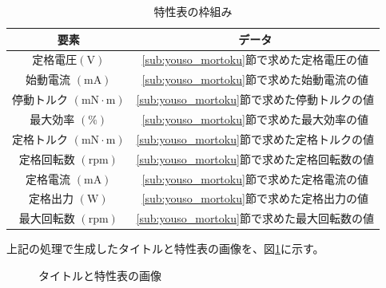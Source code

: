 \begin{table}[t]
	\centering
	\caption{特性表の枠組み}
	\begin{tabular}{|c|c|} \hline
	  要素 & データ \\ \hline \hline
	  定格電圧$(\mathrm{V})$ & \ref{sub:youso_mortoku}節で求めた定格電圧の値 \\ \hline
	  始動電流 $(\mathrm{mA})$&  \ref{sub:youso_mortoku}節で求めた始動電流の値 \\ \hline
	  停動トルク $(\mathrm{mN \cdot m})$& \ref{sub:youso_mortoku}節で求めた停動トルクの値  \\ \hline
      最大効率 $(\mathrm{\%})$& \ref{sub:youso_mortoku}節で求めた最大効率の値  \\ \hline
      定格トルク $(\mathrm{mN \cdot m})$& \ref{sub:youso_mortoku}節で求めた定格トルクの値 \\ \hline
	  定格回転数 $(\mathrm{rpm})$& \ref{sub:youso_mortoku}節で求めた定格回転数の値  \\ \hline
      定格電流 $(\mathrm{mA})$& \ref{sub:youso_mortoku}節で求めた定格電流の値  \\ \hline
      定格出力 $(\mathrm{W})$& \ref{sub:youso_mortoku}節で求めた定格出力の値 \\ \hline
	  最大回転数 $(\mathrm{rpm})$&  \ref{sub:youso_mortoku}節で求めた最大回転数の値 \\ \hline
	\end{tabular}
	\label{tab:wakugumi}
  \end{table}

上記の処理で生成したタイトルと特性表の画像を、図\ref{fig:toku_gazou}に示す。
% 	
\begin{figure}[t]
    \centering
    \caption{タイトルと特性表の画像}
	\label{fig:toku_gazou}
\end{figure}

